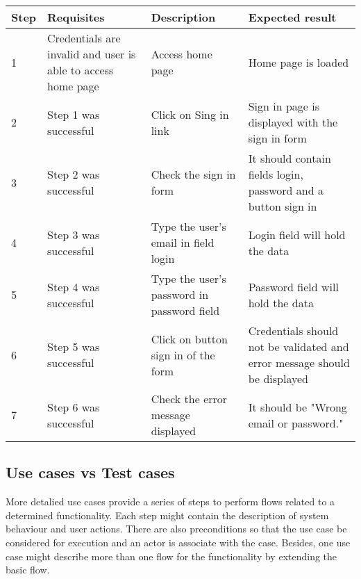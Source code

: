\begin{center}
\begin{tabular}{| l | p{3cm} | p{5cm} | p{5cm} |}
\hline

Step & Requisites & Description & Expected result \\ \hline

1 & Credentials are invalid and user is able to access home page & Access home page & Home page is loaded\\ \hline

2 & Step 1 was successful & Click on Sing in link & Sign in page is displayed with the sign in form \\ \hline

3 & Step 2 was successful & Check the sign in form & It should contain fields login, password and a button sign in \\ \hline

4 & Step 3 was successful & Type the user's email in field login & Login field will hold the data\\ \hline

5 & Step 4 was successful & Type the user's password in password field & Password field will hold the data \\ \hline

6 & Step 5 was successful & Click on button sign in of the form & Credentials should not be validated and error message should be displayed \\ \hline

7 & Step 6 was successful & Check the error message displayed & It should be "Wrong email or password."\\

\hline
\end{tabular}

\end{center}



\subsection{Use cases vs Test cases}

More detalied use cases provide a series of steps to perform flows related to a determined functionality. Each step might contain the description of system behaviour and user actions. There are also preconditions so that the use case be considered for execution and an actor is associate with the case. Besides, one use case might describe more than one flow for the functionality by extending the basic flow. 

